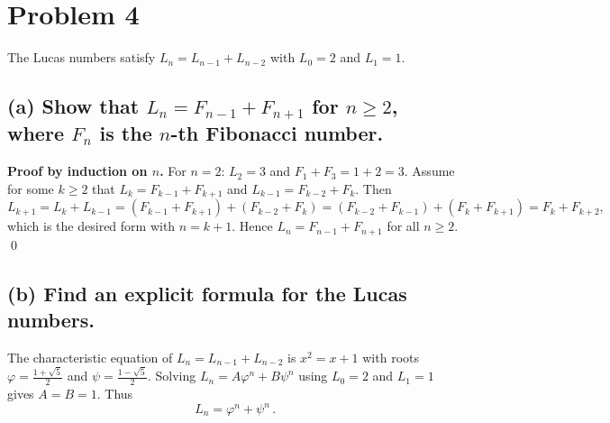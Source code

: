 \section*{Problem 4}
The Lucas numbers satisfy $L_n=L_{n-1}+L_{n-2}$ with $L_0=2$ and $L_1=1$.

\subsection*{(a) Show that $L_n=F_{n-1}+F_{n+1}$ for $n\ge2$, where $F_n$ is the $n$-th Fibonacci number.}
\textbf{Proof by induction on $n$.}
For $n=2$: $L_2=3$ and $F_{1}+F_{3}=1+2=3$.
Assume for some $k\ge2$ that $L_k=F_{k-1}+F_{k+1}$ and $L_{k-1}=F_{k-2}+F_k$.
Then
\[
L_{k+1}=L_k+L_{k-1}=(F_{k-1}+F_{k+1})+(F_{k-2}+F_k)
=(F_{k-2}+F_{k-1})+(F_k+F_{k+1})=F_k+F_{k+2},
\]
which is the desired form with $n=k+1$. Hence $L_n=F_{n-1}+F_{n+1}$ for all $n\ge2$. \qed

\subsection*{(b) Find an explicit formula for the Lucas numbers.}
The characteristic equation of $L_n=L_{n-1}+L_{n-2}$ is $x^2=x+1$ with roots
$\varphi=\frac{1+\sqrt5}{2}$ and $\psi=\frac{1-\sqrt5}{2}$. Solving
$L_n=A\varphi^n+B\psi^n$ using $L_0=2$ and $L_1=1$ gives $A=B=1$. Thus
\[
\boxed{\,L_n=\varphi^n+\psi^n\,}.
\]
